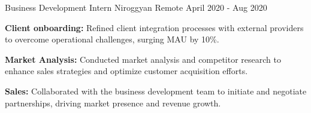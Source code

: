 \begin{cventries}
  \cventry
    {Business Development Intern} %
    {Niroggyan} %
    {Remote} %
    {April 2020 - Aug 2020} %
    {
      \begin{cvitems} %
        \item {\textbf{Client onboarding:  }Refined client integration processes with external providers to overcome operational challenges, surging MAU by 10\%.}
        \item {\textbf{Market Analysis:  }Conducted market analysis and competitor research to enhance sales strategies and optimize customer acquisition efforts.}
        \item {\textbf{Sales:  }Collaborated with the business development team to initiate and negotiate partnerships, driving market presence and revenue growth.}
      \end{cvitems}
    }



\end{cventries}
